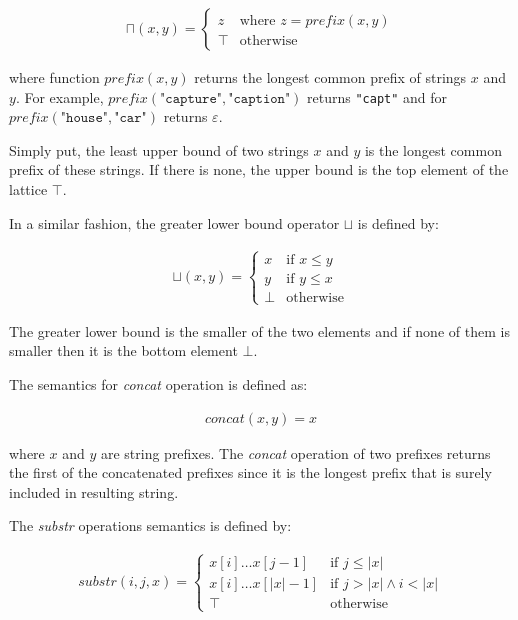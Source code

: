 \documentclass[12pt,final,oneside]{fithesis2}
\theoremstyle{definition}
\begin{document}
\begin{align*}
\sqcap (x, y) =
\begin{cases}
z & \text{where } z
  = \textit{prefix}(x, y) \\
\top       & \text{otherwise}
\end{cases}
\end{align*}

where function $\textit{prefix}(x, y)$ returns the
longest common prefix of strings $x$ and $y$. For
example, $\textit{prefix}(\texttt{"capture"}, \texttt{"caption"})$ returns
\texttt{"capt"} and for $\textit{prefix}(\texttt{"house"}, \texttt{"car"})$
returns $\varepsilon$.

Simply put, the least upper bound of two strings $x$ and $y$
is the longest common prefix of these strings. If there is
none, the upper bound is the top element of the lattice $\top$.

In a similar fashion, the greater lower bound operator $\sqcup$ is defined
by:

\begin{align*}
\sqcup (x, y) =
\begin{cases}
x    & \text{if } x \leq y \\
y    & \text{if } y \leq x \\
\bot & \text{otherwise}
\end{cases}
\end{align*}

The greater lower bound is the smaller of the two elements and if none
of them is smaller then it is the bottom element $\bot$.

The semantics for \textit{concat} operation is defined as:

\begin{align*}
\textit{concat}(x, y) = x
\end{align*}

where $x$ and $y$ are string prefixes. The \textit{concat} operation of two
prefixes returns the first of the concatenated prefixes since it is the longest
prefix that is surely included in resulting string.

The \textit{substr} operations semantics is defined by:

\begin{align*}
\textit{substr}(i, j, x) =
\begin{cases}
x[i] \dots x[j - 1]   & \text{if } j \leq |x| \\
x[i] \dots x[|x| - 1] & \text{if } j > |x| \land i < |x| \\
\top                  & \text{otherwise}
\end{cases}
\end{align*}
\end{document}
